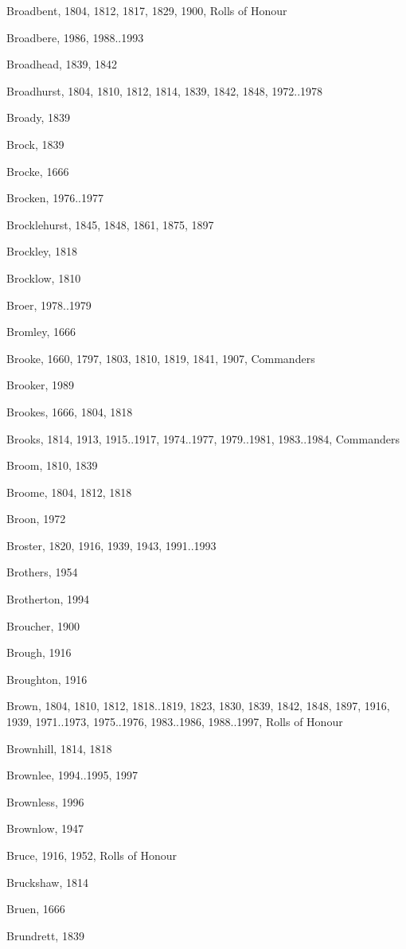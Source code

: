 \begin{theindex}
\item Broadbent, 1804, 1812, 1817, 1829, 1900, Rolls of Honour
\item Broadbere, 1986, 1988..1993
\item Broadhead, 1839, 1842
\item Broadhurst, 1804, 1810, 1812, 1814, 1839, 1842, 1848, 1972..1978
\item Broady, 1839
\item Brock, 1839
\item Brocke, 1666
\item Brocken, 1976..1977
\item Brocklehurst, 1845, 1848, 1861, 1875, 1897
\item Brockley, 1818
\item Brocklow, 1810
\item Broer, 1978..1979
\item Bromley, 1666
\item Brooke, 1660, 1797, 1803, 1810, 1819, 1841, 1907, Commanders
\item Brooker, 1989
\item Brookes, 1666, 1804, 1818
\item Brooks, 1814, 1913, 1915..1917, 1974..1977, 1979..1981, 1983..1984, Commanders
\item Broom, 1810, 1839
\item Broome, 1804, 1812, 1818
\item Broon, 1972
\item Broster, 1820, 1916, 1939, 1943, 1991..1993
\item Brothers, 1954
\item Brotherton, 1994
\item Broucher, 1900
\item Brough, 1916
\item Broughton, 1916
\item Brown, 1804, 1810, 1812, 1818..1819, 1823, 1830, 1839, 1842, 1848, 1897, 1916, 1939, 1971..1973, 1975..1976, 1983..1986, 1988..1997, Rolls of Honour
\item Brownhill, 1814, 1818
\item Brownlee, 1994..1995, 1997
\item Brownless, 1996
\item Brownlow, 1947
\item Bruce, 1916, 1952, Rolls of Honour
\item Bruckshaw, 1814
\item Bruen, 1666
\item Brundrett, 1839

\end{theindex}
